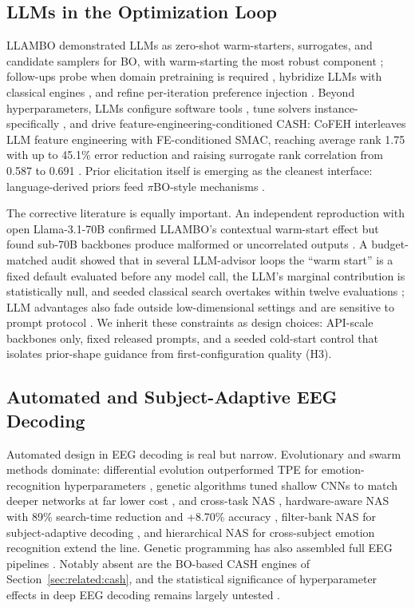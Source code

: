 \subsection{LLMs in the Optimization Loop}
\label{sec:related:llm}

LLAMBO demonstrated LLMs as zero-shot warm-starters, surrogates, and candidate samplers for BO, with warm-starting the most robust component \cite{LiuEtAl2024}; follow-ups probe when domain pretraining is required \cite{KristiadiEtAl2024}, hybridize LLMs with classical engines \cite{MahammadliErtekin2024, XuEtAl2026b}, and refine per-iteration preference injection \cite{YuanEtAl2026}. Beyond hyperparameters, LLMs configure software tools \cite{Kannan2023}, tune solvers instance-specifically \cite{WangEtAl2025}, and drive feature-engineering-conditioned CASH: CoFEH interleaves LLM feature engineering with FE-conditioned SMAC, reaching average rank 1.75 with up to 45.1\% error reduction and raising surrogate rank correlation from 0.587 to 0.691 \cite{XuEtAl2026a}. Prior elicitation itself is emerging as the cleanest interface: language-derived priors feed $\pi$BO-style mechanisms \cite{TopalisEtAl2025}.

The corrective literature is equally important. An independent reproduction with open Llama-3.1-70B confirmed LLAMBO's contextual warm-start effect but found sub-70B backbones produce malformed or uncorrelated outputs \cite{RychertEtAl2025}. A budget-matched audit showed that in several LLM-advisor loops the ``warm start'' is a fixed default evaluated before any model call, the LLM's marginal contribution is statistically null, and seeded classical search overtakes within twelve evaluations \cite{RodriguesEtAl2026}; LLM advantages also fade outside low-dimensional settings \cite{SrinivasanMenzies2026} and are sensitive to prompt protocol \cite{LeiCooper2026, GuptaEtAl2025}. We inherit these constraints as design choices: API-scale backbones only, fixed released prompts, and a seeded cold-start control that isolates prior-shape guidance from first-configuration quality (H3).

\subsection{Automated and Subject-Adaptive EEG Decoding}
\label{sec:related:eeg}

Automated design in EEG decoding is real but narrow. Evolutionary and swarm methods dominate: differential evolution outperformed TPE for emotion-recognition hyperparameters \cite{NakisaEtAl2018}, genetic algorithms tuned shallow CNNs to match deeper networks at far lower cost \cite{LeonEtAl2020}, and cross-task NAS \cite{DuanEtAl2023}, hardware-aware NAS with 89\% search-time reduction and +8.70\% accuracy \cite{ZhuEtAl2025}, filter-bank NAS for subject-adaptive decoding \cite{WangEtAl2026}, and hierarchical NAS for cross-subject emotion recognition \cite{HuEtAl2019, AvvalEtAl2025} extend the line. Genetic programming has also assembled full EEG pipelines \cite{MirandaEtAl2022}. Notably absent are the BO-based CASH engines of Section~\ref{sec:related:cash}, and the statistical significance of hyperparameter effects in deep EEG decoding remains largely untested \cite{CooneyEtAl2020}.

